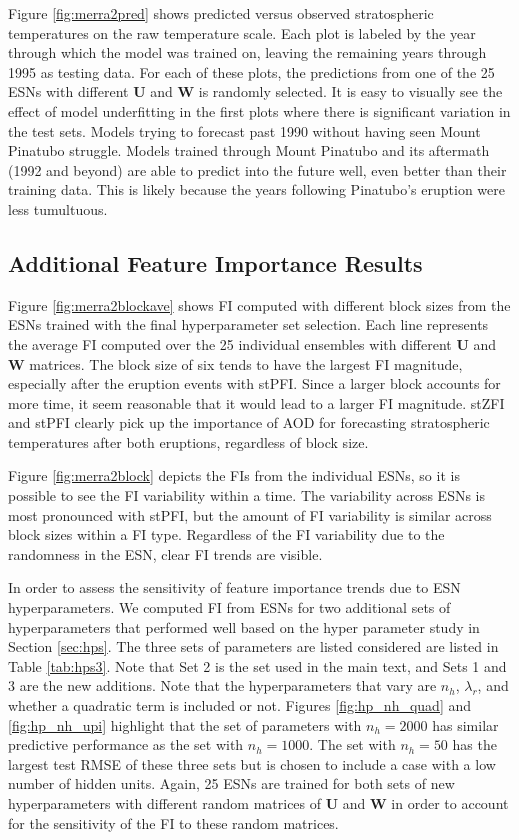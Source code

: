 \documentclass[AMS,STIX2COL]{WileyNJD-v2}
\begin{document}
Figure \ref{fig:merra2pred} shows predicted versus observed stratospheric temperatures on the raw temperature scale. Each plot is labeled by the year through which the model was trained on, leaving the remaining years through 1995 as testing data. For each of these plots, the predictions from one of the 25 ESNs with different $\textbf{U}$ and $\textbf{W}$ is randomly selected. It is easy to visually see the effect of model underfitting in the first plots where there is significant variation in the test sets. Models trying to forecast past 1990 without having seen Mount Pinatubo struggle. Models trained through Mount Pinatubo and its aftermath (1992 and beyond) are able to predict into the future well, even better than their training data. This is likely because the years following Pinatubo's eruption were less tumultuous. 

\subsection{Additional Feature Importance Results}

Figure \ref{fig:merra2blockave} shows FI computed with different block sizes from the ESNs trained with the final hyperparameter set selection. Each line represents the average FI computed over the 25 individual ensembles with different $\textbf{U}$ and $\textbf{W}$ matrices. The block size of six tends to have the largest FI magnitude, especially after the eruption events with stPFI. Since a larger block accounts for more time, it seem reasonable that it would lead to a larger FI magnitude. stZFI and stPFI clearly pick up the importance of AOD for forecasting stratospheric temperatures after both eruptions, regardless of block size.

Figure \ref{fig:merra2block} depicts the FIs from the individual ESNs, so it is possible to see the FI variability within a time. The variability across ESNs is most pronounced with stPFI, but the amount of FI variability is similar across block sizes within a FI type. Regardless of the FI variability due to the randomness in the ESN, clear FI trends are visible.

In order to assess the sensitivity of feature importance trends due to ESN hyperparameters. We computed FI from ESNs for two additional sets of hyperparameters that performed well based on the hyper parameter study in Section \ref{sec:hps}. The three sets of parameters are listed considered are listed in Table \ref{tab:hps3}. Note that Set 2 is the set used in the main text, and Sets 1 and 3 are the new additions. Note that the hyperparameters that vary are $n_h$, $\lambda_r$, and whether a quadratic term is included or not. Figures \ref{fig:hp_nh_quad} and \ref{fig:hp_nh_upi} highlight that the set of parameters with $n_h=2000$ has similar predictive performance as the set with $n_h=1000$. The set with $n_h=50$ has the largest test RMSE of these three sets but is chosen to include a case with a low number of hidden units. Again, 25 ESNs are trained for both sets of new hyperparameters with different random matrices of $\textbf{U}$ and $\textbf{W}$ in order to account for the sensitivity of the FI to these random matrices.
\end{document}
